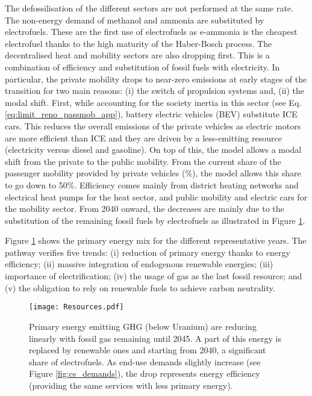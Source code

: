 The defossilisation of the different sectors are not performed at the same rate. The non-energy demand of methanol and ammonia are substituted by electrofuels. These are the first use of electrofuels as  e-ammonia is the cheapest electrofuel thanks to the high maturity of the Haber-Bosch process. The decentralised heat and mobility sectors are also dropping first. This is a combination of efficiency and substitution of fossil fuels with electricity. In particular, the private mobility drops to near-zero emissions at early stages of the transition for two main reasons: (i) the switch of propulsion systems and, (ii) the modal shift. First, while accounting for the society inertia in this sector (see Eq. \ref{eq:limit_reno_passmob_app}), battery electric vehicles (BEV) substitute \gls{ICE} cars. This reduces the overall emissions of the private vehicles as electric motors are more efficient than \gls{ICE} and they are driven by a less-emitting resource (\ie electricity versus diesel and gasoline). On top of this, the model allows a modal shift from the private to the public mobility. From the current share of the passenger mobility provided by private vehicles (\%), the model allows this share to go down to 50\%. Efficiency comes mainly from district heating networks and electrical heat pumps for the heat sector, and public mobility and electric cars for the mobility sector. From 2040 onward, the decreases are mainly due to the substitution of the remaining fossil fuels by electrofuels as illustrated in Figure \ref{fig:pestd_primary_energy}.

Figure \ref{fig:pestd_primary_energy} shows the primary energy mix for the different representative years. The pathway verifies five trends: (i) reduction of primary energy thanks to energy efficiency; (ii) massive integration of endogenous renewable energies; (iii) importance of electrification; (iv) the usage of gas as the last fossil resource; and (v) the obligation to rely on renewable fuels to achieve carbon neutrality.

 \begin{figure}[!htbp]
\centering
\texttt{[image: Resources.pdf]}
\caption{Primary energy emitting \gls{GHG} (below Uranium) are reducing linearly with fossil gas remaining until 2045. A part of this energy is replaced by renewable ones and starting from 2040, a significant share of electrofuels. As end-use demands slightly increase (see Figure \ref{fig:cs_demands}), the drop represents energy efficiency (\ie providing the same services with less primary energy).}
\label{fig:pestd_primary_energy}
\end{figure}

